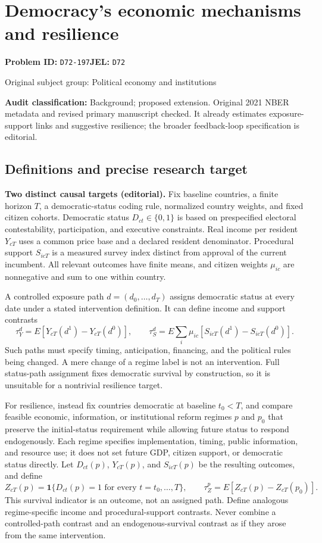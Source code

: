 \documentclass[11pt,a4paper]{article}
\begin{document}
\section*{Democracy's economic mechanisms and resilience}
\textbf{Problem ID:} \texttt{D72-197}\quad \textbf{JEL:} \texttt{D72}\par
\label{problem:OP-0388}
{\sffamily\small\color{muted}Original subject group: Political economy and institutions\par}
\label{definitions:problem:30007670}
\textbf{Audit classification:} Background; proposed extension. Original 2021 NBER metadata and revised primary manuscript checked. It already estimates exposure-support links and suggestive resilience; the broader feedback-loop specification is editorial.
\subsection*{Definitions and precise research target}
\textbf{Two distinct causal targets (editorial).} Fix baseline countries, a finite horizon \(T\), a democratic-status coding rule, normalized country weights, and fixed citizen cohorts. Democratic status \(D_{ct}\in\{0,1\}\) is based on prespecified electoral contestability, participation, and executive constraints. Real income per resident \(Y_{cT}\) uses a common price base and a declared resident denominator. Procedural support \(S_{icT}\) is a measured survey index distinct from approval of the current incumbent. All relevant outcomes have finite means, and citizen weights \(\mu_{ic}\) are nonnegative and sum to one within country.

A controlled exposure path \(d=(d_0,\ldots,d_T)\) assigns democratic status at every date under a stated intervention definition. It can define income and support contrasts
\[
 \tau_Y^d=E[Y_{cT}(d^1)-Y_{cT}(d^0)],\qquad
 \tau_S^d=E\sum_i\mu_{ic}[S_{icT}(d^1)-S_{icT}(d^0)].
\]
Such paths must specify timing, anticipation, financing, and the political rules being changed. A mere change of a regime label is not an intervention. Full status-path assignment fixes democratic survival by construction, so it is unsuitable for a nontrivial resilience target.

For resilience, instead fix countries democratic at baseline \(t_0<T\), and compare feasible economic, information, or institutional reform regimes \(p\) and \(p_0\) that preserve the initial-status requirement while allowing future status to respond endogenously. Each regime specifies implementation, timing, public information, and resource use; it does not set future GDP, citizen support, or democratic status directly. Let \(D_{ct}(p)\), \(Y_{cT}(p)\), and \(S_{icT}(p)\) be the resulting outcomes, and define
\[
 Z_{cT}(p)=\mathbf 1\{D_{ct}(p)=1\text{ for every }t=t_0,\ldots,T\},\qquad
 \tau_Z^p=E[Z_{cT}(p)-Z_{cT}(p_0)].
\]
This survival indicator is an outcome, not an assigned path. Define analogous regime-specific income and procedural-support contrasts. Never combine a controlled-path contrast and an endogenous-survival contrast as if they arose from the same intervention.
\end{document}

